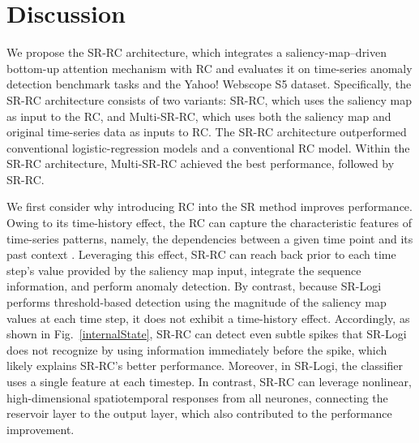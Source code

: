 \documentclass[pdflatex,sn-nature]{sn-jnl}
\theoremstyle{thmstyleone}%
\theoremstyle{thmstyletwo}%
\theoremstyle{thmstylethree}%
\begin{document}
\section*{Discussion}
We propose the SR-RC architecture, which integrates a saliency-map–driven bottom-up attention mechanism with RC and evaluates it on time-series anomaly detection benchmark tasks and the Yahoo! Webscope S5 dataset.
Specifically, the SR-RC architecture consists of two variants: SR-RC, which uses the saliency map as input to the RC, and Multi-SR-RC, which uses both the saliency map and original time-series data as inputs to RC.
The SR-RC architecture outperformed conventional logistic-regression models and a conventional RC model. Within the SR-RC architecture, Multi-SR-RC achieved the best performance, followed by SR-RC.

We first consider why introducing RC into the SR method improves performance.
Owing to its time-history effect, the RC can capture the characteristic features of time-series patterns, namely, the dependencies between a given time point and its past context \cite{lukovsevivcius2009reservoir,cucchi2022hands}.
Leveraging this effect, SR-RC can reach back prior to each time step’s value provided by the saliency map input, integrate the sequence information, and perform anomaly detection.
By contrast, because SR-Logi performs threshold-based detection using the magnitude of the saliency map values at each time step, it does not exhibit a time-history effect.
Accordingly, as shown in Fig.~\ref{internalState}, SR-RC can detect even subtle spikes that SR-Logi does not recognize by using information immediately before the spike, which likely explains SR-RC’s better performance.
Moreover, in SR-Logi, the classifier uses a single feature at each timestep.
In contrast, SR-RC can leverage nonlinear, high-dimensional spatiotemporal responses from all neurones, connecting the reservoir layer to the output layer, which also contributed to the performance improvement.
\end{document}

